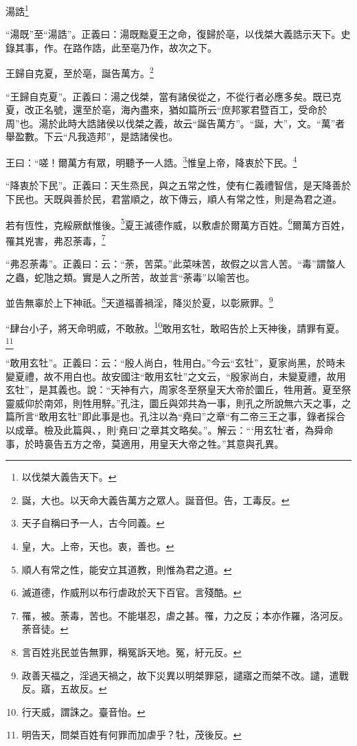 湯誥\footnote{以伐桀大義告天下。}

{\noindent\shu{}\fzkt “湯既”至“湯誥”。正義曰：湯既黜夏王之命，復歸於亳，以伐桀大義誥示天下。史錄其事，作。在路作誥，此至亳乃作，故次之下。 \par}

王歸自克夏，至於亳，誕告萬方。\footnote{誕，大也。以天命大義告萬方之眾人。誕音但。告，工毒反。}

{\noindent\shu{}\fzkt “王歸自克夏”。正義曰：湯之伐桀，當有諸侯從之，不從行者必應多矣。既已克夏，改正名號，還至於亳，海內盡來，猶如篇所云“庶邦冢君暨百工，受命於周”也。湯於此時大誥諸侯以伐桀之義，故云“誕告萬方”。“誕，大”，文。“萬”者舉盈數。下云“凡我造邦”，是誥諸侯也。 \par}

王曰：“嗟！爾萬方有眾，明聽予一人誥。\footnote{天子自稱曰予一人，古今同義。}惟皇上帝，降衷於下民。\footnote{皇，大。上帝，天也。衷，善也。}

{\noindent\shu{}\fzkt “降衷於下民”。正義曰：天生烝民，與之五常之性，使有仁義禮智信，是天降善於下民也。天既與善於民，君當順之，故下傳云，順人有常之性，則是為君之道。 \par}

若有恆性，克綏厥猷惟後。\footnote{順人有常之性，能安立其道教，則惟為君之道。}夏王滅德作威，以敷虐於爾萬方百姓。\footnote{滅道德，作威刑以布行虐政於天下百官。言殘酷。}爾萬方百姓，罹其兇害，弗忍荼毒，\footnote{罹，被。荼毒，苦也。不能堪忍，虐之甚。罹，力之反；本亦作羅，洛河反。荼音徒。}

{\noindent\shu{}\fzkt “弗忍荼毒”。正義曰：云：“荼，苦菜。”此菜味苦，故假之以言人苦。“毒”謂螫人之蟲，蛇虺之類。實是人之所苦，故並言“荼毒”以喻苦也。 \par}

並告無辜於上下神祇。\footnote{言百姓兆民並告無罪，稱冤訴天地。冤，紆元反。}天道福善禍淫，降災於夏，以彰厥罪。\footnote{政善天福之，淫過天禍之，故下災異以明桀罪惡，譴寤之而桀不改。譴，遣戰反。寤，五故反。}

“肆台小子，將天命明威，不敢赦。\footnote{行天威，謂誅之。臺音怡。}敢用玄牡，敢昭告於上天神後，請罪有夏。\footnote{明告天，問桀百姓有何罪而加虐乎？牡，茂後反。}

{\noindent\shu{}\fzkt “敢用玄牡”。正義曰：云：“殷人尚白，牲用白。”今云“玄牡”，夏家尚黑，於時未變夏禮，故不用白也。故安國注“敢用玄牡”之文云，“殷家尚白，未變夏禮，故用玄牡”，是其義也。說：“天神有六，周家冬至祭皇天大帝於圜丘，牲用蒼。夏至祭靈威仰於南郊，則牲用騂。”孔注，圜丘與郊共為一事，則孔之所說無六天之事，之篇所言“敢用玄牡”即此事是也。孔注以為“堯曰”之章“有二帝三王之事，錄者採合以成章。檢及此篇與、，則‘堯曰’之章其文略矣。”。解云：“‘用玄牡’者，為舜命事，於時裛告五方之帝，莫適用，用皇天大帝之牲。”其意與孔異。 \par}

